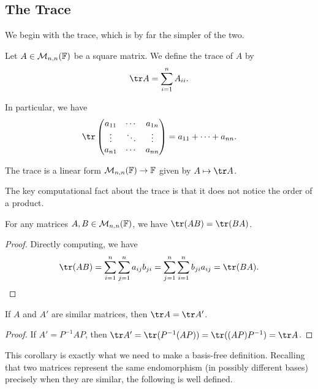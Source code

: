 \documentclass[a4paper]{scrartcl}
\begin{document}
\subsection{The Trace}

We begin with the trace, which is by far the simpler of the two.

\begin{definition}[Trace]
    Let $A \in \mathcal{M}_{n, n}(\mathbb{F})$ be a square matrix. We define the trace of $A$ by
    $$
    \tr A = \sum_{i = 1}^n A_{ii}.
    $$
\end{definition}

In particular, we have
$$
\tr \begin{pmatrix}
    a_{11} & \cdots & a_{1n} \\
    \vdots & \ddots & \vdots \\
    a_{n1} & \cdots & a_{nn}
\end{pmatrix} = a_{11} + \cdots + a_{nn}.
$$

\begin{remark}
    The trace is a linear form $\mathcal{M}_{n,n}(\mathbb{F}) \rightarrow \mathbb{F}$ given by $A \mapsto \tr A$.
\end{remark}

The key computational fact about the trace is that it does not notice the order of a product.

\begin{lemma}
    For any matrices $A, B \in \mathcal{M}_{n,n}(\mathbb{F})$, we have $\tr (AB) = \tr(BA)$.
\end{lemma}
\begin{proof}
    Directly computing, we have
    $$
    \tr (AB) = \sum_{i = 1}^n \sum_{j = 1}^n a_{ij}b_{ji} = \sum_{j = 1}^n \sum_{i = 1}^n b_{ji} a_{ij} = \tr (BA). \qedhere
    $$
\end{proof}

\begin{corollary}
    If $A$ and $A'$ are similar matrices, then $\tr A = \tr A'$.
\end{corollary}
\begin{proof}
    If $A' = P^{-1}AP$, then $\tr A' = \tr(P^{-1}(AP)) = \tr((AP)P^{-1}) = \tr A$.
\end{proof}

This corollary is exactly what we need to make a basis-free definition. Recalling that two matrices represent the same endomorphism (in possibly different bases) precisely when they are similar, the following is well defined.
\end{document}
